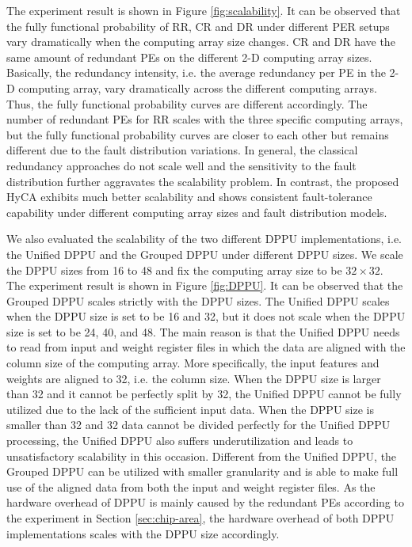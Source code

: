 The experiment result is shown in Figure \ref{fig:scalability}. It can be observed that the fully functional probability of RR, CR and DR under different PER setups vary dramatically when the computing array size changes. CR and DR have the same amount of redundant PEs on the different 2-D computing array sizes. Basically, the redundancy intensity, i.e. the average redundancy per PE in the 2-D computing array, vary dramatically across the different computing arrays. Thus, the fully functional probability curves are different accordingly. The number of redundant PEs for RR scales with the three specific computing arrays, but the fully functional probability curves are closer to each other but remains different due to the fault distribution variations. In general, the classical redundancy approaches do not scale well and the sensitivity to the fault distribution further aggravates the scalability problem. In contrast, the proposed HyCA exhibits much better scalability and shows consistent fault-tolerance capability under different computing array sizes and fault distribution models.

We also evaluated the scalability of the two different DPPU implementations, i.e. the Unified DPPU and the Grouped DPPU under different DPPU sizes. We scale the DPPU sizes from 16 to 48 and fix the computing array size to be $32 \times 32$. The experiment result is shown in Figure \ref{fig:DPPU}. It can be observed that the Grouped DPPU scales strictly with the DPPU sizes. The Unified DPPU scales when the DPPU size is set to be 16 and 32, but it does not scale when the DPPU size is set to be 24, 40, and 48. The main reason is that the Unified DPPU needs to read from input and weight register files in which the data are aligned with the column size of the computing array. More specifically, the input features and weights are aligned to 32, i.e. the column size. When the DPPU size is larger than 32 and it cannot be perfectly split by 32, the Unified DPPU cannot be fully utilized due to the lack of the sufficient input data. When the DPPU size is smaller than 32 and 32 data cannot be divided perfectly for the Unified DPPU processing, the Unified DPPU also suffers underutilization and leads to unsatisfactory scalability in this occasion. Different from the Unified DPPU, the Grouped DPPU can be utilized with smaller granularity and is able to make full use of the aligned data from both the input and weight register files. As the hardware overhead of DPPU is mainly caused by the redundant PEs according to the experiment in Section \ref{sec:chip-area}, the hardware overhead of both DPPU implementations scales with the DPPU size accordingly.

